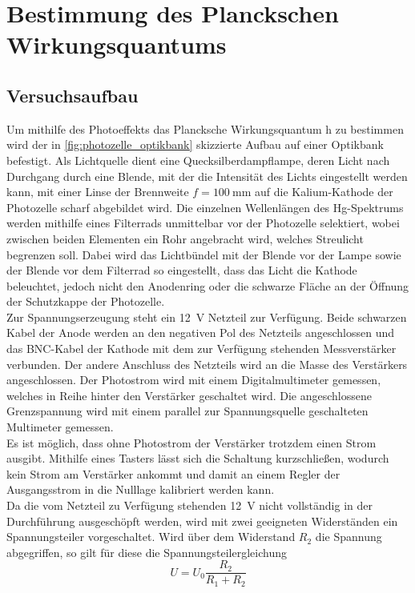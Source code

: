 \section{Bestimmung des Planckschen Wirkungsquantums}
\subsection{Versuchsaufbau}
Um mithilfe des Photoeffekts\cite[S.78-80]{Demtröder:829119} das Plancksche Wirkungsquantum h zu bestimmen wird der
in \cref{fig:photozelle_optikbank} skizzierte Aufbau auf einer Optikbank befestigt.
Als Lichtquelle dient eine Quecksilberdampflampe, deren Licht nach Durchgang durch eine
Blende, mit der die Intensität des Lichts eingestellt werden kann,
mit einer Linse der Brennweite $f=\SI{100}{\milli\meter}$ auf die Kalium-Kathode
der Photozelle scharf abgebildet wird. Die einzelnen Wellenlängen des Hg-Spektrums
werden mithilfe eines Filterrads unmittelbar vor der Photozelle selektiert,
wobei zwischen beiden Elementen ein Rohr angebracht wird, welches Streulicht
begrenzen soll. Dabei wird das Lichtbündel mit der Blende vor der Lampe sowie der Blende vor
dem Filterrad so eingestellt, dass das Licht die Kathode beleuchtet, jedoch nicht
den Anodenring oder die schwarze Fläche an der Öffnung der Schutzkappe der Photozelle.\\

Zur Spannungserzeugung steht ein \SI{12}{\volt} Netzteil zur Verfügung. Beide schwarzen
Kabel der Anode werden an den negativen Pol des Netzteils angeschlossen und
das BNC-Kabel der Kathode mit dem zur Verfügung stehenden Messverstärker verbunden.
Der andere Anschluss des Netzteils wird an die Masse des Verstärkers angeschlossen.
Der Photostrom wird mit einem Digitalmultimeter gemessen, welches in Reihe hinter
den Verstärker geschaltet wird.
Die angeschlossene Grenzspannung wird mit einem parallel zur Spannungsquelle
geschalteten Multimeter gemessen.\\

Es ist möglich, dass ohne Photostrom der Verstärker trotzdem einen Strom ausgibt.
Mithilfe eines Tasters lässt sich die Schaltung kurzschließen, wodurch kein Strom
am Verstärker ankommt und damit an einem Regler der Ausgangsstrom in die Nulllage
kalibriert werden kann.\\

Da die vom Netzteil zu Verfügung stehenden \SI{12}{\volt} nicht vollständig in der Durchführung
ausgeschöpft werden, wird mit zwei geeigneten Widerständen ein Spannungsteiler
vorgeschaltet. Wird über dem Widerstand $R_2$ die Spannung abgegriffen, so gilt für diese
die Spannungsteilergleichung
\begin{equation}
	U = U_0\frac{R_2}{R_1 + R_2}
	\label{eq:spannungsteiler}
\end{equation}



